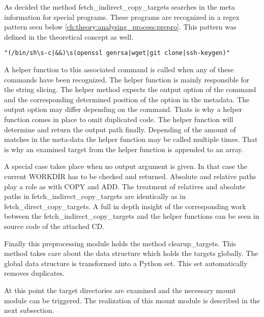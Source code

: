 As decided the method fetch\_indirect\_copy\_targets searches in the meta information for special programs. These programs are recognized in a regex pattern seen below \ref{ch:theory:analysing_process:prepro}. This pattern was defined in the theoretical concept as well.
\begin{lstlisting}
"(/bin/sh\s-c|&&)\s(openssl genrsa|wget|git clone|ssh-keygen)"
\end{lstlisting}
A helper function to this associated command is called when any of these commands have been recognized. The helper function is mainly responsible for the string slicing.
The helper method expects the output option of the command and the corresponding determined position of the option in the metadata.
The output option may differ depending on the command. Thats is why a helper function comes in place to omit duplicated code. The helper function will determine and return the output path finally.
Depending of the amount of matches in the meta-data the helper function may be called multiple times. That is why an examined target from the helper function is appended to an array. 

A special case takes place when no output argument is given. In that case the current WORKDIR has to be checked and returned.
Absolute and relative paths play a role as with COPY and ADD. The treatment of relatives and absolute paths in fetch\_indirect\_copy\_targets are identically as in fetch\_direct\_copy\_targets.
A full in depth insight of the corresponding work between the fetch\_indirect\_copy\_targets and the helper functions can be seen in source code of the attached CD.

Finally this preprocessing module holds the method clearup\_targets. This method takes care about the data structure which holds the targets globally. The global data structure is transformed into a Python set. This set automatically removes duplicates.
	
At this point the target directories are examined and the necessary mount module can be triggered. The realization of this mount module is described in the next subsection.

